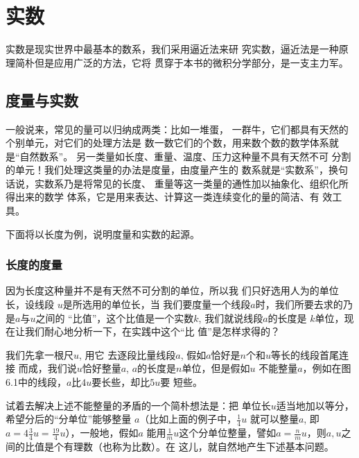\chapter{实数}
实数是现实世界中最基本的数系，我们采用逼近法来研
究实数，逼近法是一种原理简朴但是应用广泛的方法，它将
贯穿于本书的微积分学部分，是一支主力军。

\section{度量与实数}

一般说来，常见的量可以归纳成两类：比如一堆蛋，
一群牛，它们都具有天然的个别单元，对它们的处理方法是
数一数它们的个数，用来数个数的数学体系就是“自然数系”。
另一类量如长度、重量、温度、压力这种量不具有天然不可
分割的单元！我们处理这类量的办法是度量，由度量产生的
数系就是“实数系”，换句话说，实数系乃是将常见的长度、
重量等这一类量的通性加以抽象化、组织化所得出来的数学
体系，它是用来表达、计算这一类连续变化的量的简洁、有
效工具。

下面将以长度为例，说明度量和实数的起源。

\subsection{长度的度量}
因为长度这种量并不是有天然不可分割的单位，所以我
们只好选用人为的单位长，设线段
$u$是所选用的单位长，当
我们要度量一个线段$a$时，我们所要去求的乃是$a$与$u$之间的
“比值”，这个比值是一个实数$k$, 我们就说线段$a$的长度是
$k$单位，现在让我们耐心地分析一下，在实践中这个“比
值”是怎样求得的？

我们先拿一根尺$u$, 用它 
去逐段比量线段$a$, 假如$a$恰好是$n$个和$u$等长的线段首尾连接
而成，我们说$u$恰好整量$a$, $a$的长度是$n$单位，但是假如$u$
不能整量$a$，例如在图6.1中的线段，$a$比$4u$要长些，却比$5u$要
短些。

\begin{figure}[htp]
    \centering
{}
    \caption{}
\end{figure}


试着去解决上述不能整量的矛盾的一个简朴想法是：把
单位长$u$适当地加以等分，希望分后的“分单位”能够整量
$a$（比如上面的例子中，$\frac{1}{4}u$
就可以整量$a$, 即$a=4\frac{3}{4}u=\frac{19}{4}u$），一般地，假如$a$
能用$\frac{1}{m}u$这个分单位整量，譬如$a=\frac{n}{m}u$，则$a,u$之间的比值是个有理数（也称为比数）。在
这儿，就自然地产生下述基本问题。

